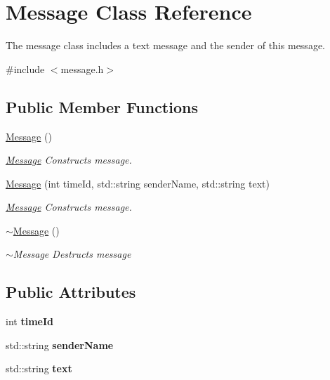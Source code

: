 \hypertarget{classMessage}{}\section{Message Class Reference}
\label{classMessage}


The message class includes a text message and the sender of this message.  




{\ttfamily \#include $<$message.\+h$>$}

\subsection*{Public Member Functions}
\begin{DoxyCompactItemize}
\item 
\hyperlink{classMessage_a4fc4f717b634e66070366cb7722d7761}{Message} ()\hypertarget{classMessage_a4fc4f717b634e66070366cb7722d7761}{}\label{classMessage_a4fc4f717b634e66070366cb7722d7761}

\begin{DoxyCompactList}\small\item\em \hyperlink{classMessage}{Message} Constructs message. \end{DoxyCompactList}\item 
\hyperlink{classMessage_a5d6d662e09c544f19a7e74c79cd0bc1a}{Message} (int time\+Id, std\+::string sender\+Name, std\+::string text)
\begin{DoxyCompactList}\small\item\em \hyperlink{classMessage}{Message} Constructs message. \end{DoxyCompactList}\item 
\hyperlink{classMessage_a3f7275462831f787a861271687bcad67}{$\sim$\+Message} ()\hypertarget{classMessage_a3f7275462831f787a861271687bcad67}{}\label{classMessage_a3f7275462831f787a861271687bcad67}

\begin{DoxyCompactList}\small\item\em $\sim$\+Message Destructs message \end{DoxyCompactList}\end{DoxyCompactItemize}
\subsection*{Public Attributes}
\begin{DoxyCompactItemize}
\item 
int {\bfseries time\+Id}\hypertarget{classMessage_a7f0a37293d3aa43d1063c7a0b0c31417}{}\label{classMessage_a7f0a37293d3aa43d1063c7a0b0c31417}

\item 
std\+::string {\bfseries sender\+Name}\hypertarget{classMessage_a189be09be2f9c48c8678f47696fca4ff}{}\label{classMessage_a189be09be2f9c48c8678f47696fca4ff}

\item 
std\+::string {\bfseries text}\hypertarget{classMessage_a6643d6d90c0fdb11886b17d44a7a8183}{}\label{classMessage_a6643d6d90c0fdb11886b17d44a7a8183}

\end{DoxyCompactItemize}



